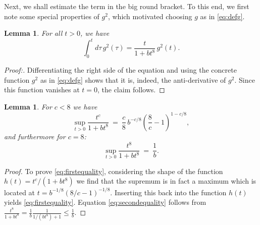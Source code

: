 \documentclass[b5paper,draft,openbib,12pt]{memoir}
\newtheorem{Lemma}[Def]{Lemma}
\begin{document}
Next, we shall estimate the term in the big round bracket. To this 
end, we first note some special properties of \(g^2\), which 
motivated choosing $g$ as in \eqref{eq:defg}.
\begin{Lemma}\label{lem:int}
 For all \(t>0\), we have
\begin{equation}
	\int_0^t d\tau \, g^2(\tau) = \frac{t}{1+b t^8} \, g^2(t).
\end{equation}
\end{Lemma}
\begin{proof}[Proof:] Differentiating the right side of the equation 
  and using the concrete function \(g^2\) as in \eqref{eq:defg} shows 
  that it is, indeed, the anti-derivative of \(g^2\). Since this 
  function vanishes at \(t=0\), the claim follows. 
\end{proof}

\begin{Lemma}\label{lem:someidentities}
For $c<8$ we have
\begin{equation}
	\sup_{t>0} \frac{t^c}{1+b t^8}  ~=~\frac{c}{8}\,  b^{-c/8} \left( \frac{8}{c}-1\right)^{1-c/8},
	\label{eq:firstequality}
\end{equation}
and furthermore for $c=8$:
\begin{equation}
	\sup_{t>0} \frac{t^8}{1+b t^8} ~=~\frac{1}{b}.
	\label{eq:secondequality}
\end{equation}
\end{Lemma}

\begin{proof}
To prove \eqref{eq:firstequality}, considering the shape of the 
function $h(t)= t^c/(1+b t^8)$ we find that the supremum is in 
fact a maximum which is located at 
\(t = b^{-1/8} \left(8/c-1\right)^{-1/8}\). Inserting this back into 
the function $h(t)$ yields \eqref{eq:firstequality}.  
Equation \eqref{eq:secondequality} follows from 
$\frac{t^8}{1+b t^8} = \frac{1}{b} \frac{1}{1/(b t^8) +1} \leq 
\frac{1}{b}$. 
\end{proof}
\end{document}
